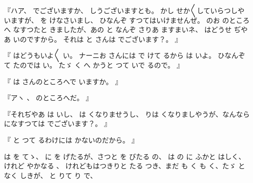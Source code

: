 『ハア、
でございますか、
しうございますとも。
かし
せか〳〵していらつしやいますが、
を
けなさいまし、
ひなんぞ
すつてはいけませんぜ。
のお
のところへ
なすつたと
きましたが、あの
と
なんぞ
さりあ
ますまいネ、
はどうせ
ぢやあ
いのですから。
それは
と
さんは
でございます？。
』

『
はどうもいよ〳〵
い。
ナーニお
さんには
で
けて
るから
は
いよ。
ひなんぞ
て
たのでは
い。
たゞ
く
へ
かうと
つて
いで
るので。
』

『
は
さんのところへで
いますか。
』

『アヽ
、
のところへだ。
』

『それぢやあ
は
いし、
は
くなりませうし、
りは
くなりましやうが、なんなら
になすつては
でございます？。
』

『
と
つて
るわけには
かないのだから。
』

は
を
てゝ、
に
を
げたるが、さつと
を
びたる
の、
は
の
に
ふかと
はしく、
けれど
やかなる
、
けれどもはつきりと
たる
つき、まだ
も
く
も
く、たゞ
と
なく
しきが、
と
りて
り
で、

